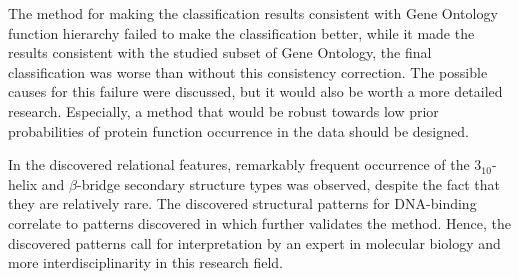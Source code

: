 \documentclass[11pt,twoside,a4paper]{book}
\begin{document}
The method for making the classification results consistent with Gene Ontology \cite{bnet}
function hierarchy failed to make the classification better,
while it made the results consistent with the studied subset of Gene Ontology,
the final classification was worse than without this consistency correction.
The possible causes for this failure were discussed,
but it would also be worth a more detailed research.
Especially, a method that would be robust towards low prior probabilities of 
protein function occurrence in the data should be designed.

In the discovered relational features,
remarkably frequent occurrence of the $3_{10}$-helix and $\beta$-bridge
secondary structure types was observed, despite the fact that they are relatively rare.
The discovered structural patterns for DNA-binding correlate 
to patterns discovered in \cite{szabova} which further validates the method.
Hence, the discovered patterns call for interpretation by an expert 
in molecular biology and more interdisciplinarity in this research field.

%

%
%
{
\def\CS{$\cal C\kern-0.1667em\lower.5ex\hbox{$\cal S$}\kern-0.075em $}

}

%

\end{document}
